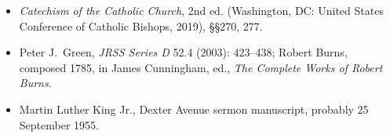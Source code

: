 {\begin{itemize}[itemsep=0em,topsep=0.15em,parsep=0pt]
\ifdefined\TriptychSynthesisEdition\else
\item \emph{Catechism of the Catholic Church}, 2nd ed. (Washington, DC: United States Conference of Catholic Bishops, 2019), \S\S270, 277.
\fi
\item Peter J.~Green,  \emph{JRSS Series D} 52.4 (2003): 423--438; Robert Burns,  composed 1785, in James Cunningham, ed., \emph{The Complete Works of Robert Burns}.
\item Martin Luther King Jr.,  Dexter Avenue sermon manuscript, probably 25 September 1955.
\end{itemize}
}

\par\vspace{0pt}
\vspace{0pt}
